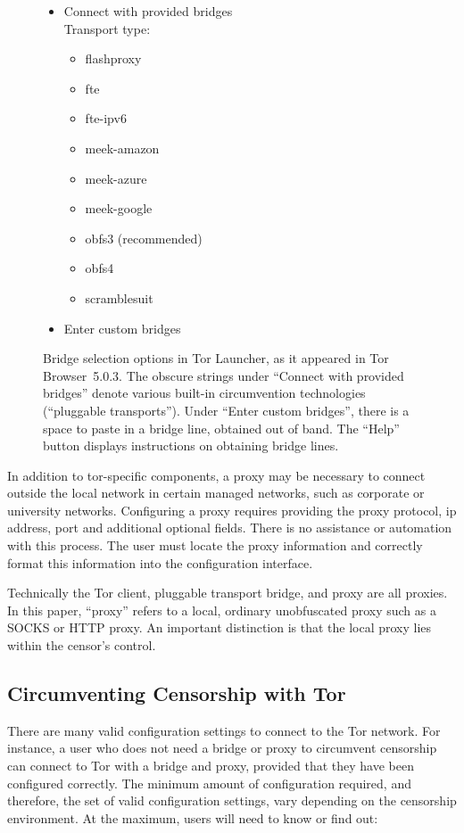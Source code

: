 \documentclass[USenglish,oneside,twocolumn]{article}
\begin{document}
\begin{figure}
\small
\begin{itemize}
\renewcommand{\labelitemi}{$\circ$}
\item Connect with provided bridges\\
Transport type:
\begin{itemize}
\item flashproxy
\item fte
\item fte-ipv6
\item meek-amazon
\item meek-azure
\item meek-google
\item obfs3 (recommended)
\item obfs4
\item scramblesuit
\end{itemize}
\item Enter custom bridges\qquad{}\\
\end{itemize}
\caption{
Bridge selection options in Tor Launcher, as it appeared in Tor Browser~5.0.3.
The obscure strings under ``Connect with provided bridges'' denote various
built-in circumvention technologies (``pluggable transports'').
Under ``Enter custom bridges'', there is a space to paste in
a bridge line, obtained out of band.
The ``Help'' button displays instructions on obtaining
bridge lines.
}
\label{fig:bridge-options}
\end{figure}

In addition to tor-specific components, a proxy may be necessary to connect 
outside the local network in certain managed networks, such as corporate or university networks.
Configuring a proxy requires providing the proxy protocol, ip address, port and additional optional
fields. There is no assistance or automation with this process. The user must locate the 
proxy information and correctly format this information into the configuration interface. 
  
Technically the Tor client, pluggable transport bridge, and proxy are all
proxies. In this paper, ``proxy'' refers to a local, ordinary unobfuscated proxy such
as a SOCKS or HTTP proxy. An important distinction is that the local proxy lies within the 
censor's control.

\subsection{Circumventing Censorship with Tor}
There are many valid configuration settings to connect to the Tor network.
For instance, a user who does not need a bridge or proxy to circumvent censorship
can connect to Tor with a bridge and proxy, provided that they have been configured correctly. 
The minimum amount of configuration required, and therefore, the set of valid configuration settings,
vary depending on the censorship environment. At the maximum, users will need to know or find out:\\
\end{document}
